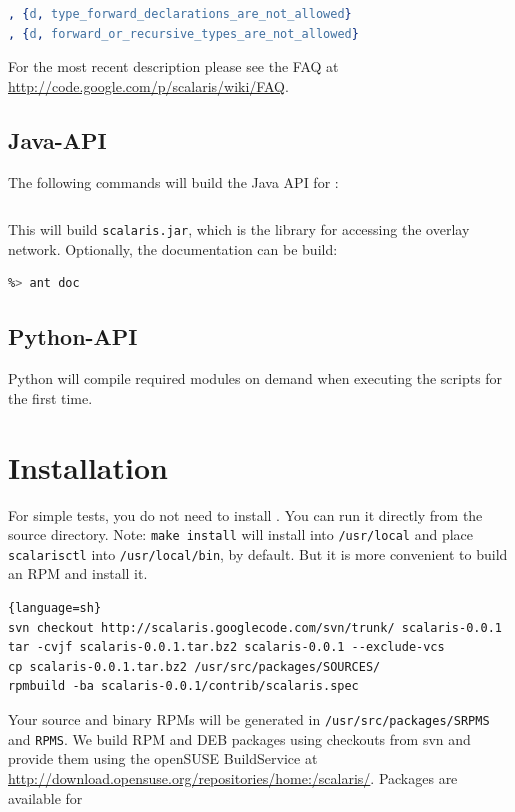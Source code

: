 \documentclass[a4paper]{scrreprt}
\newcommand{\code}[1]{\lstinline[basicstyle=\ttfamily]!#1!}
\begin{document}
\begin{lstlisting}[language=erlang]
, {d, type_forward_declarations_are_not_allowed}
, {d, forward_or_recursive_types_are_not_allowed}
\end{lstlisting}

For the most recent description please see the FAQ at
\url{http://code.google.com/p/scalaris/wiki/FAQ}.

\subsection{Java-API}

The following commands will build the Java API for \scalaris{}:
\begin{lstlisting}[language=sh]
%> make java
\end{lstlisting}

This will build {\tt scalaris.jar}, which is the library for accessing
the overlay network. Optionally, the documentation can be build:
\begin{lstlisting}[language=sh]
%> cd java-api
%> ant doc
\end{lstlisting}

\subsection{Python-API}

Python will compile required modules on demand when executing the scripts for
the first time.

\section{Installation}
\label{sec:install}

For simple tests, you do not need to install \scalaris{}. You can run it
directly from the source directory. Note: \code{make install} will install
\scalaris{} into \code{/usr/local} and place \code{scalarisctl} into
\code{/usr/local/bin}, by default. But it is more convenient to build an RPM
and install it.

\begin{lstlisting}{language=sh}
svn checkout http://scalaris.googlecode.com/svn/trunk/ scalaris-0.0.1
tar -cvjf scalaris-0.0.1.tar.bz2 scalaris-0.0.1 --exclude-vcs
cp scalaris-0.0.1.tar.bz2 /usr/src/packages/SOURCES/
rpmbuild -ba scalaris-0.0.1/contrib/scalaris.spec
\end{lstlisting}

Your source and binary RPMs will be generated in
\code{/usr/src/packages/SRPMS} and \code{RPMS}. We build RPM and DEB packages
using checkouts from svn and provide them using the openSUSE BuildService at
\url{http://download.opensuse.org/repositories/home:/scalaris/}. Packages
are available for
\end{document}
